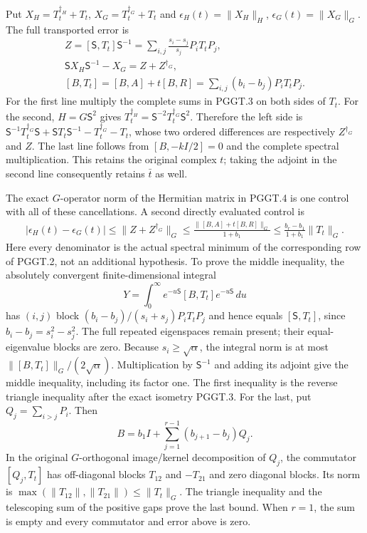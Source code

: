 Put $X_H=T_t^{\dagger_H}+T_t$,
$X_G=T_t^{\dagger_G}+T_t$ and
$\epsilon_H(t)=\|X_H\|_H$,
$\epsilon_G(t)=\|X_G\|_G$. The full transported error is
\[
\begin{gathered}
 Z=[\mathsf S,T_t]\mathsf S^{-1}
   =\sum_{i,j}\frac{s_i-s_j}{s_j}P_iT_tP_j,\\
 \mathsf S X_H\mathsf S^{-1}-X_G
                           =Z+Z^{\dagger_G},\\
 [B,T_t]=[B,A]+t[B,R]
            =\sum_{i,j}(b_i-b_j)P_iT_tP_j.
\end{gathered}
\tag{PGGT.4}\label{eq:pggt-entire-error}
\]
For the first line multiply the complete sums in PGGT.3 on
both sides of $T_t$. For the second, $H=G\mathsf S^2$
gives $T_t^{\dagger_H}=\mathsf S^{-2}
T_t^{\dagger_G}\mathsf S^2$. Therefore the left side
is $\mathsf S^{-1}T_t^{\dagger_G}\mathsf S
+\mathsf ST_t\mathsf S^{-1}-T_t^{\dagger_G}-T_t$,
whose two ordered differences are respectively
$Z^{\dagger_G}$ and $Z$. The last line follows from
$[B,-kI/2]=0$ and the complete spectral multiplication.
This retains the original complex $t$; taking the adjoint
in the second line consequently retains $\bar t$ as well.

The exact $G$-operator norm of the Hermitian matrix in
PGGT.4 is one control with all of these cancellations. A
second directly evaluated control is
\[
\begin{gathered}
 |\epsilon_H(t)-\epsilon_G(t)|
 \leq\|Z+Z^{\dagger_G}\|_G
 \leq\frac{\|[B,A]+t[B,R]\|_G}{1+b_1}
 \leq\frac{b_r-b_1}{1+b_1}\|T_t\|_G.
\end{gathered}
\tag{PGGT.5}\label{eq:pggt-concrete-generator-control}
\]
Here every denominator is the actual spectral minimum of
the corresponding row of PGGT.2, not an additional
hypothesis. To prove the middle inequality, the absolutely
convergent finite-dimensional integral
\[
 Y=\int_0^\infty
 e^{-u\mathsf S}[B,T_t]e^{-u\mathsf S}\,du
\]
has $(i,j)$ block $(b_i-b_j)/(s_i+s_j)P_iT_tP_j$
and hence equals $[\mathsf S,T_t]$, since
$b_i-b_j=s_i^2-s_j^2$. The full repeated eigenspaces
remain present; their equal-eigenvalue blocks are zero.
Because $s_i\geq\sqrt\alpha$, the integral norm is
at most $\|[B,T_t]\|_G/(2\sqrt\alpha)$.
Multiplication by $\mathsf S^{-1}$ and adding its adjoint
give the middle inequality, including its factor one.
The first inequality is the reverse triangle inequality
after the exact isometry PGGT.3. For the last, put
$Q_j=\sum_{i>j}P_i$. Then
\[
 B=b_1I+\sum_{j=1}^{r-1}(b_{j+1}-b_j)Q_j.
\]
In the original $G$-orthogonal image/kernel decomposition
of $Q_j$, the commutator $[Q_j,T_t]$ has off-diagonal
blocks $T_{12}$ and $-T_{21}$ and zero diagonal blocks.
Its norm is $\max(\|T_{12}\|,\|T_{21}\|)\leq\|T_t\|_G$.
The triangle inequality and the telescoping sum of the
positive gaps prove the last bound. When $r=1$, the sum
is empty and every commutator and error above is zero.

